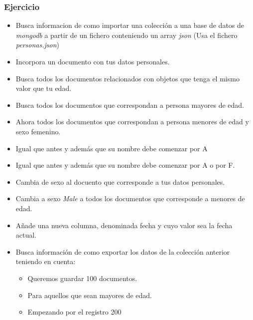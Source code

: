 \documentclass[4paper]{article}
\begin{document}
\subsubsection{Ejercicio}
\begin{itemize}
\item Busca informacion de como importar una colección a una base de datos de \emph{mongodb} a partir de un fichero conteniendo un array \emph{json} (Usa el fichero \emph{personas.json})
\item Incorpora un documento con tus datos personales.
\item Busca todos los documentos relacionados con objetos que tenga el mismo valor que tu edad.
\item Busca todos los documentos que correspondan a persona mayores de edad.
\item Ahora todos los documentos que correspondan a persona menores de edad y sexo femenino.
\item Igual que antes y además que su nombre debe comenzar por A
\item Igual que antes y además que su nombre debe comenzar por A o por F.
\item Cambia de sexo al docuento que corresponde a tus datos personales.
\item Cambia a sexo \emph{Male} a todos los documentos que corresponde a menores de edad.
\item Añade una nueva columna, denominada fecha y cuyo valor sea la fecha actual.
\item Busca información de como exportar los datos de la colección anterior teniendo en cuenta:
\begin{itemize}
\item Queremos guardar 100 documentos.
\item Para aquellos que sean mayores de edad.
\item Empezando por el registro 200
\end{itemize} 
\end{itemize}
\end{document}
